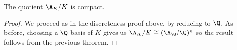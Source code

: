 \begin{theorem}
  \label{NumberField.AdeleRing.cocompact}
  \leanok
  The quotient $\A_K/K$ is compact.
\end{theorem}
\begin{proof}
  We proceed as in the discreteness proof above, by reducing to $\Q$. As before, choosing
  a $\Q$-basis of $K$ gives us $\A_K/K\cong(\A_{\Q}/\Q)^n$ so the result follows from
  the previous theorem.
\end{proof}

